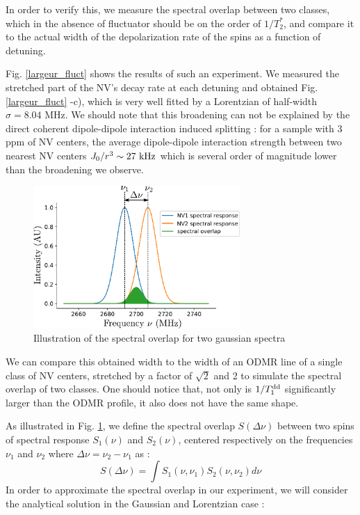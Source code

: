 \documentclass[preprintnumbers,amsmath,amssymb,onecolumn,12pt]{revtex4-2}\usepackage{graphicx}%
\begin{document}
In order to verify this, we measure the spectral overlap between two classes, which in the absence of fluctuator should be on the order of $1/T_2^*$, and compare it to the actual width of the depolarization rate of the spins
as a function of detuning.

Fig. \ref{largeur_fluct} shows the results of such an experiment. We measured the stretched part of the NV's decay rate at each detuning and obtained Fig. \ref{largeur_fluct} -c), which is very well fitted by a Lorentzian of half-width $\sigma=8.04$ MHz. 
We should note that this broadening can not be explained by the direct coherent dipole-dipole interaction induced splitting : for a sample with 3 ppm of NV centers, the average dipole-dipole interaction strength between two nearest NV centers $J_0/r^3 \sim 27\ \rm kHz$ which is several order of magnitude lower than the broadening we observe. 

\begin{figure}[h]
\includegraphics[width=0.7\textwidth]{Figures_SI/overlap}
\caption{Illustration of the spectral overlap for two gaussian spectra}
\label{overlap}
\end{figure}

We can compare this obtained width to the width of an ODMR line of a single class of NV centers, stretched by a factor of $\sqrt{2}$ and 2 to simulate the spectral overlap of two classes. One should notice that, not only is $1/T_1^{\rm dd}$ significantly larger than the ODMR profile, it also does not have the same shape. 

As illustrated in Fig. \ref{overlap}, we define the spectral overlap $S(\Delta \nu)$ between two spins of spectral response $S_1(\nu)$ and $S_2(\nu)$, centered respectively on the frequencies $\nu_1$ and $\nu_2$ where $\Delta \nu = \nu_2-\nu_1$ as :
\begin{equation}
S(\Delta \nu)=\int S_1(\nu, \nu_1)S_2(\nu, \nu_2) d\nu
\end{equation}
In order to approximate the spectral overlap in our experiment, we will consider the analytical solution in the Gaussian and Lorentzian case :
\end{document}
